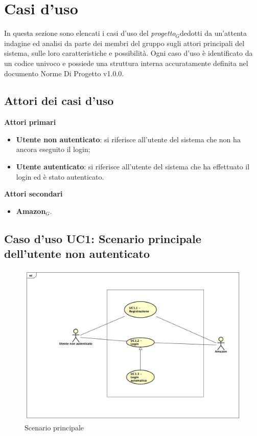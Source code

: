 \chapter{Casi d'uso}
In questa sezione sono elencati i casi d'uso del \textit{progetto$_{G}$}dedotti da un'attenta indagine ed analisi da parte dei membri del gruppo sugli attori principali del sistema, sulle loro caratteristiche e possibilità.
Ogni caso d'uso è identificato da un codice univoco e possiede una struttura interna accuratamente definita nel documento Norme Di Progetto 
v1.0.0.
\section{Attori dei casi d'uso}
\textbf{Attori primari}
\begin{itemize}
	\item \textbf{Utente non autenticato}: si riferisce all'utente del sistema che non ha ancora eseguito il login;
	\item \textbf{Utente autenticato}: si riferisce all'utente del sistema che ha effettuato il login ed è stato autenticato.
\end{itemize}
\textbf{Attori secondari}
\begin{itemize}
	\item \textbf{Amazon$_{G}$}.
\end{itemize}

\section{Caso d'uso UC1: Scenario principale dell'utente non autenticato}

\begin{figure}[h]
	\centering
	\includegraphics[scale=0.4]{Diagram/UC1.png}
	\caption{Scenario principale}\label{}
\end{figure}

